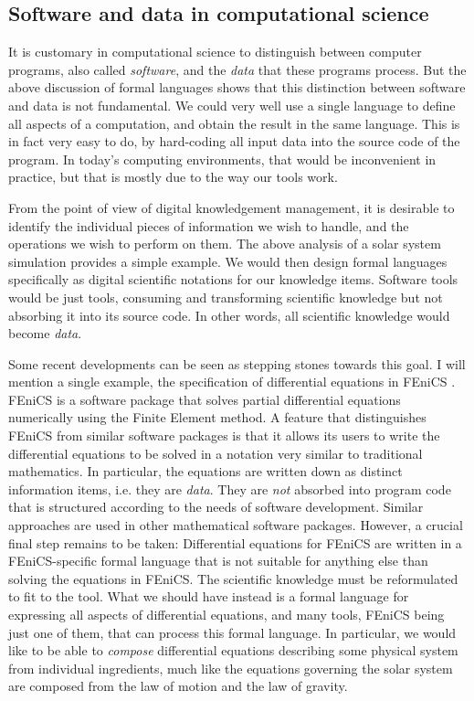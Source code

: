 \subsection{Software and data in computational science}
\label{software-data}

It is customary in computational science to distinguish between computer programs, also called \textit{software}, and the \textit{data} that these programs process. But the above discussion of formal languages shows that this distinction between software and data is not fundamental. We could very well use a single language to define all aspects of a computation, and obtain the result in the same language. This is in fact very easy to do, by hard-coding all input data into the source code of the program. In today's computing environments, that would be inconvenient in practice, but that is mostly due to the way our tools work.

From the point of view of digital knowledgement management, it is desirable to identify the individual pieces of information we wish to handle, and the operations we wish to perform on them. The above analysis of a solar system simulation provides a simple example. We would then design formal languages specifically as digital scientific notations for our knowledge items. Software tools would be just tools, consuming and transforming scientific knowledge but not absorbing it into its source code. In other words, all scientific knowledge would become \textit{data}.

Some recent developments can be seen as stepping stones towards this goal. I will mention a single example, the specification of differential equations in FEniCS \cite{alnaes_fenics_2015}. FEniCS is a software package that solves partial differential equations numerically using the Finite Element method. A feature that distinguishes FEniCS from similar software packages is that it allows its users to write the differential equations to be solved in a notation very similar to traditional mathematics. In particular, the equations are written down as distinct information items, i.e. they are \textit{data}. They are \textit{not} absorbed into program code that is structured according to the needs of software development. Similar approaches are used in other mathematical software packages. However, a crucial final step remains to be taken: Differential equations for FEniCS are written in a FEniCS-specific formal language that is not suitable for anything else than solving the equations in FEniCS. The scientific knowledge must be reformulated to fit to the tool. What we should have instead is a formal language for expressing all aspects of differential equations, and many tools, FEniCS being just one of them, that can process this formal language. In particular, we would like to be able to \textit{compose} differential equations describing some physical system from individual ingredients, much like the equations governing the solar system are composed from the law of motion and the law of gravity.

